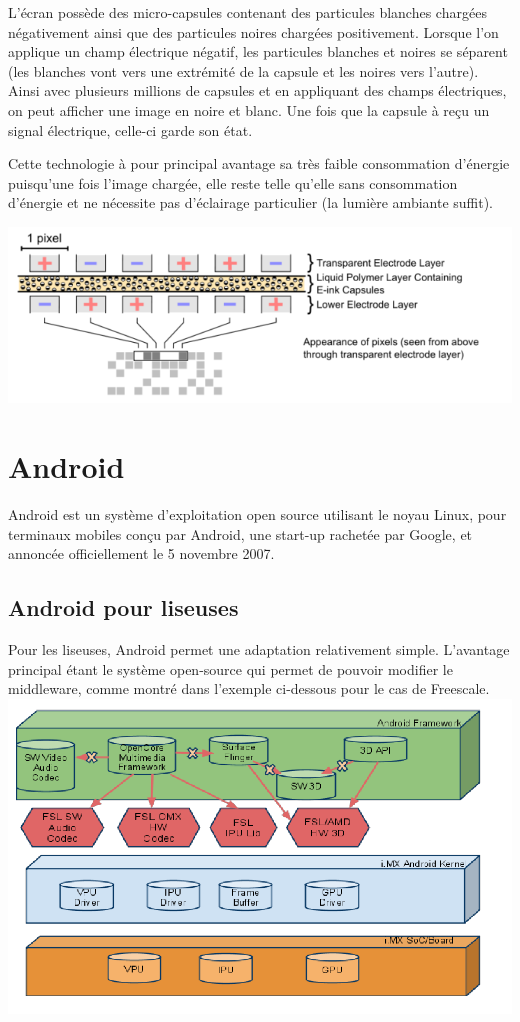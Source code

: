 L'écran possède des micro-capsules contenant des particules blanches chargées négativement ainsi que des particules noires chargées positivement. Lorsque l'on applique un champ électrique négatif, les particules blanches et noires se séparent (les blanches vont vers une extrémité de la capsule et les noires vers l'autre). Ainsi avec plusieurs millions de capsules et en appliquant des champs électriques, on peut afficher une image en noire et blanc. Une fois que la capsule à reçu un signal électrique, celle-ci garde son état.

Cette technologie à pour principal avantage sa très faible consommation d'énergie puisqu'une fois l'image chargée, elle reste telle qu'elle sans consommation d'énergie et ne nécessite pas d'éclairage particulier (la lumière ambiante suffit).

\begin{center}
	\includegraphics{Electrophoretic.png}
\end{center}


\section{Android}
Android est un système d'exploitation open source utilisant le noyau Linux, pour terminaux mobiles conçu par Android, une start-up rachetée par Google, et annoncée officiellement le 5 novembre 2007.

\subsection{Android pour liseuses}
Pour les liseuses, Android permet une adaptation relativement simple. L'avantage principal étant le système open-source qui permet de pouvoir modifier le middleware, comme montré dans l'exemple ci-dessous pour le cas de Freescale.\\
\includegraphics[scale=0.45]{Android.png}

